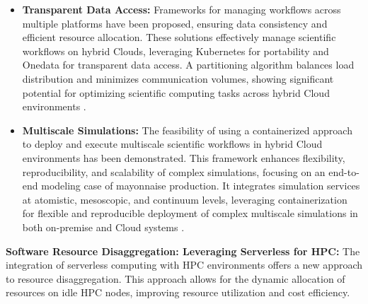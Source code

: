 \begin{itemize}
\item \textbf{Transparent Data Access:} Frameworks for managing workflows across multiple platforms have been proposed, ensuring data consistency and efficient resource allocation. These solutions effectively manage scientific workflows on hybrid Clouds, leveraging Kubernetes for portability and Onedata for transparent data access. A partitioning algorithm balances load distribution and minimizes communication volumes, showing significant potential for optimizing scientific computing tasks across hybrid Cloud environments \cite{balis_scientific_2021}.
\item \textbf{Multiscale Simulations:} The feasibility of using a containerized approach to deploy and execute multiscale scientific workflows in hybrid Cloud environments has been demonstrated. This framework enhances flexibility, reproducibility, and scalability of complex simulations, focusing on an end-to-end modeling case of mayonnaise production. It integrates simulation services at atomistic, mesoscopic, and continuum levels, leveraging containerization for flexible and reproducible deployment of complex multiscale simulations in both on-premise and Cloud systems \cite{elisseev_multiscale_2022}.
\end{itemize}

    \noindent
    \textbf{Software Resource Disaggregation: Leveraging Serverless for HPC:} The integration of serverless computing with HPC environments offers a new approach to resource disaggregation. This approach allows for the dynamic allocation of resources on idle HPC nodes, improving resource utilization and cost efficiency.

